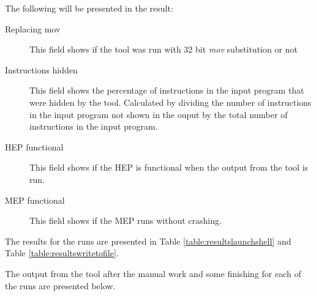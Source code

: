 \documentclass[11pt,twoside]{eitExjobb}
\begin{document}
The following will be presented in the result:
\begin{description}
\item[Replacing mov] This field shows if the tool was run with 32 bit \emph{mov} substitution or not
\item[Instructions hidden] This field shows the percentage of instructions in the input program that were hidden by the tool. Calculated by dividing the number of instructions in the input program not shown in the ouput by the total number of instructions in the input program.
\item[HEP functional] This field shows if the HEP is functional when the output from the tool is run.
\item[MEP functional] This field shows if the MEP runs without crashing.
\end{description}

\noindent The results for the runs are presented in Table \ref{table:resultslaunchshell} and Table \ref{table:resultswritetofile}.

\begin{table}[h]

\caption{Results for \texttt{launchshell}}
\label{table:resultslaunchshell}
\end{table}
\begin{table}

\caption{Results for \texttt{writetofile}}
\label{table:resultswritetofile}
\end{table}


\noindent The output from the tool after the manual work and some finishing for each of the runs are presented below.
\end{document}
